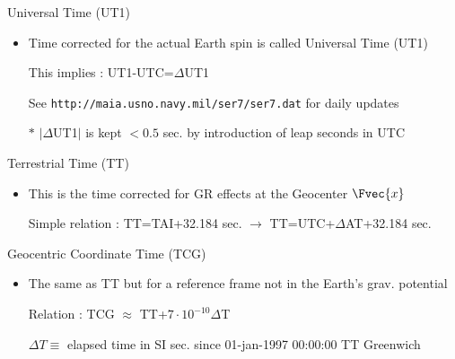 \Tr
\begin{center}
{\red Universal Time (UT1)}
\end{center}
%
\begin{itemize}
\item Time corrected for the actual Earth spin is called {\blue Universal Time (UT1)} 
\item[] This implies : {\blue UT1-UTC=$\Delta$UT1}
\item[] See {\tt http://maia.usno.navy.mil/ser7/ser7.dat} for daily updates
\item[$\ast$] $|\Delta$UT1$|$ is kept $<0.5$ sec. by introduction of leap seconds in UTC
\end{itemize}
%
\begin{center}
{\red Terrestrial Time (TT)}
\end{center}
%
\begin{itemize}
\item This is the time corrected for GR effects at the Geocenter $\Fvec{x}$
\item[] Simple relation : {\blue TT=TAI+32.184 sec.} $\rightarrow$ {\blue TT=UTC+$\Delta$AT+32.184 sec.}
\end{itemize}
%
\begin{center}
{\red Geocentric Coordinate Time (TCG)}
\end{center}
%
\begin{itemize}
\item The same as TT but for a reference frame not in the Earth's grav. potential
\item[] Relation : {\blue TCG $\approx$ TT+$7 \cdot 10^{-10} \Delta$T}
\item[] $\Delta T \equiv$ elapsed time in SI sec. since 01-jan-1997 00:00:00 TT Greenwich
\end{itemize}

